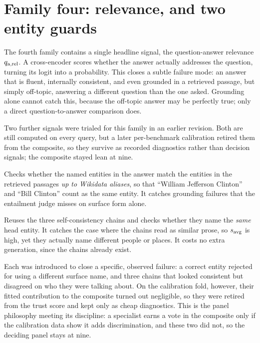 \section{Family four: relevance, and two entity guards}
\label{sec:verifier-entity}

The fourth family contains a single headline signal, the question-answer relevance
$q_{\text{a,rel}}$. A cross-encoder scores whether the answer actually addresses the question,
turning its logit into a probability. This closes a subtle failure mode: an answer
that is fluent, internally consistent, and even grounded in a retrieved passage, but
simply off-topic, answering a different question than the one asked. Grounding alone
cannot catch this, because the off-topic answer may be perfectly true; only a direct
question-to-answer comparison does.

Two further signals were trialed for this family in an earlier revision. Both are
still computed on every query, but a later per-benchmark calibration retired them
from the composite, so they survive as recorded diagnostics rather than decision
signals; the composite stayed lean at nine.

\begin{description}[leftmargin=0pt, labelsep=0.5em, style=nextline]
  \item[Alias overlap.] Checks whether the named entities in the answer match the
  entities in the retrieved passages \emph{up to Wikidata aliases}, so that
  ``William Jefferson Clinton'' and ``Bill Clinton'' count as the same entity. It
  catches grounding failures that the entailment judge misses on surface form alone.
  \item[Entity-head consistency.] Reuses the three self-consistency chains and checks
  whether they name the \emph{same} head entity. It catches the case where the chains
  read as similar prose, so $s_{\text{avg}}$ is high, yet they actually name different people
  or places. It costs no extra generation, since the chains already exist.
\end{description}

\begin{intuition}
Each was introduced to close a specific, observed failure: a correct entity rejected
for using a different surface name, and three chains that looked consistent but
disagreed on who they were talking about. On the calibration fold, however, their
fitted contribution to the composite turned out negligible, so they were retired
from the trust score and kept only as cheap diagnostics. This is the panel
philosophy meeting its discipline: a specialist earns a vote in the composite only
if the calibration data show it adds discrimination, and these two did not, so the
deciding panel stays at nine.
\end{intuition}


